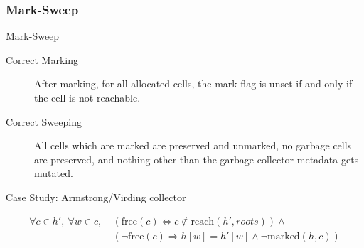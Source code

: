 \documentclass[usenames,dvipsnames]{beamer}
\renewcommand{\iff}{\Leftrightarrow}
\renewcommand{\implies}{\Rightarrow}
\newcommand{\reach}[2]{\mathrm{reach}\left(#1, #2\right)}
\newcommand{\free}[1]{\mathrm{free}\left(#1\right)}
\newcommand{\marked}[2]{\mathrm{marked}\left(#1, #2\right)}
\begin{document}
\subsubsection{Mark-Sweep}

\begin{frame}{Mark-Sweep}
  \begin{description}
  \item[Correct Marking] After marking, for all allocated cells, the
    mark flag is unset if and only if the cell is not
    reachable.

  \item[Correct Sweeping] All cells which are marked are preserved and
    unmarked, no garbage cells are preserved, and nothing other than
    the garbage collector metadata gets mutated.
  \end{description}

  Case Study: Armstrong/Virding collector

  \begin{align*}
    \forall c \in h',\ \forall w \in c,\ &(\free{c} \iff c \notin
    \reach{h'}{roots}) \land\\
    &(\lnot\free{c} \implies h[w] = h'[w] \land
    \lnot\marked{h}{c}) 
  \end{align*}



\end{frame}
\end{document}
